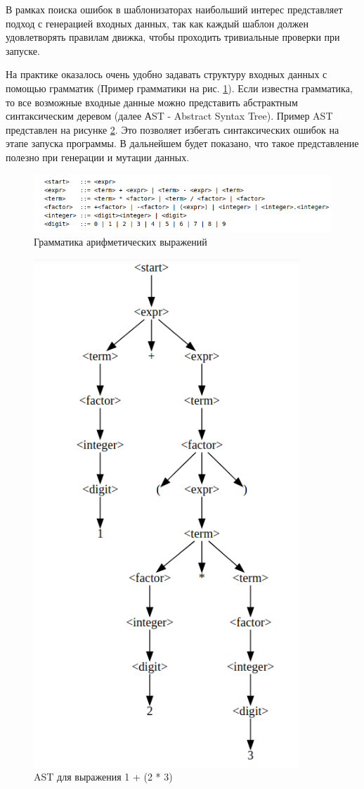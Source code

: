 \documentclass[a4paper]{article}
\begin{document}
В рамках поиска ошибок в шаблонизаторах наибольший интерес представляет подход с генерацией входных данных, так как каждый шаблон должен удовлетворять правилам движка, чтобы проходить тривиальные проверки при запуске.

На практике оказалось очень удобно задавать структуру входных данных с помощью грамматик (Пример грамматики на рис. \ref{SimpleGrammar}). Если известна грамматика, то все возможные входные данные можно представить абстрактным синтаксическим деревом (далее АST - Abstract Syntax Tree). Пример AST представлен на рисунке \ref{SimpleAST}. Это позволяет избегать синтаксических ошибок на этапе запуска программы. В дальнейшем будет показано, что такое представление полезно при генерации и мутации данных.

\begin{figure}[ht!]
\includegraphics[width=180mm]{Expressions_Grammar.png}
\caption{Грамматика арифметических выражений}
\label{SimpleGrammar}
\end{figure}

\begin{figure}[ht!]
\includegraphics[width=100mm]{SimpleAST.png}
\caption{AST для выражения 1 + (2 * 3)}
\label{SimpleAST}
\end{figure}
\end{document}
